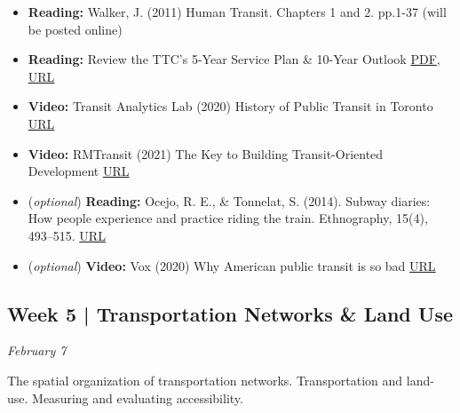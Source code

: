 \documentclass[11pt]{article}
\begin{document}
	\begin{itemize}
		\item \textbf{Reading:} Walker, J. (2011) Human Transit. Chapters 1 and 2. pp.1-37 (will be posted online)
		
		\item \textbf{Reading:} Review the TTC’s 5-Year Service Plan \& 10-Year Outlook \href{https://ttc-cdn.azureedge.net/-/media/Project/TTC/DevProto/Documents/Home/About-the-TTC/5_year_plan_10_year_outlook/Attachment-1-TTC_5_year_SP_web_accessible_R3.pdf?rev=69cfa3fbb3034d8a8ca5aaff03bf6a17&hash=9208204C7255C70154C0DFD161BA16F9}{PDF}, \href{https://www.ttc.ca/about-the-ttc/projects-and-plans/5-Year-Service-Plan-and-10-Year-Outlook}{URL}
		
		\item \textbf{Video:} Transit Analytics Lab (2020) History of Public Transit in Toronto \href{https://www.youtube.com/watch?v=0Rd4RzsRsWg}{URL}
		
		\item \textbf{Video:} RMTransit (2021) The Key to Building Transit-Oriented Development \href{https://www.youtube.com/watch?v=5HSI_PZBsPc}{URL}
		
		\item (\textit{optional}) \textbf{Reading:} Ocejo, R. E., \& Tonnelat, S. (2014). Subway diaries: How people experience and practice
		riding the train. Ethnography, 15(4), 493–515.
		\href{https://doi.org/10.1177/1466138113491171}{URL}
		
		\item (\textit{optional}) \textbf{Video:} Vox (2020) Why American public transit is so bad \href{https://www.youtube.com/watch?v=-ZDZtBRTyeI}{URL}
		
	\end{itemize}
	
	
	
	
	
	
	
	
	
	
	\subsection*{Week 5 | Transportation Networks \& Land Use}
	
	\textit{February 7}
	
	The spatial organization of transportation networks. Transportation and land-use. Measuring and evaluating accessibility.
	
\end{document}
